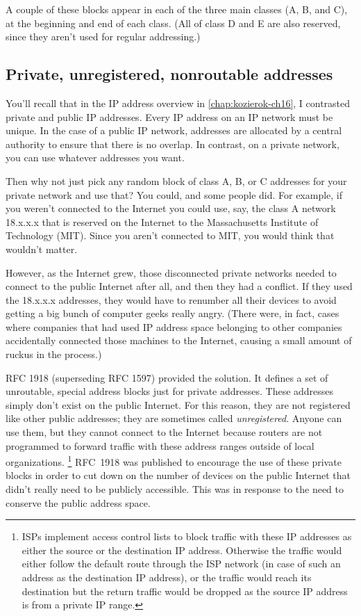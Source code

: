 A couple of these blocks appear in each of the three main classes (A, B, and C), at the beginning and end of each class.
(All of class D and E are also reserved, since they aren't used for regular addressing.)



\subsection{Private, unregistered, nonroutable addresses}

You'll recall that in the IP address overview in \vref{chap:kozierok-ch16}, I contrasted private and
public IP addresses. Every IP address on an IP network must be unique.
In the case of a public IP network, addresses are allocated by a central
authority to ensure that there is no overlap. In contrast, on a private
network, you can use whatever addresses you want.

Then why not just pick any random block of class A, B, or C addresses
for your private network and use that? You could, and some people did.
For example, if you weren't connected to the Internet you could use,
say, the class A network 18.x.x.x that is reserved on the Internet to the Massachusetts Institute of Technology (MIT).
Since you aren't connected to MIT, you would think that wouldn't matter.

However, as the Internet grew, those disconnected private networks
needed to connect to the public Internet after all, and then they had a
conflict. If they used the 18.x.x.x addresses, they would have to
renumber all their devices to avoid getting a big bunch of computer
geeks really angry. (There were, in fact, cases where companies that had
used IP address space belonging to other companies accidentally
connected those machines to the Internet, causing a small amount of ruckus in the process.)

RFC 1918 (superseding RFC 1597) provided the solution. It defines a set
of unroutable, special address blocks just for private addresses.
These addresses simply don't exist on the public Internet.
For this reason, they are not registered like other public addresses; they are sometimes called \emph{unregistered}.
Anyone can use them, but they cannot connect to the Internet because routers are not programmed to forward
traffic with these address ranges outside of local organizations.%
   \footnote{
      ISPs implement access control lists to block traffic with these IP addresses as either the source or the destination IP address.
      Otherwise the traffic would either follow the default route through the ISP network (in case of such an address as the destination IP address),
      or the traffic would reach its destination but the return traffic would be dropped as the source IP address is from a private IP range.
   }
RFC~1918 was published to encourage the use of these private blocks in order to cut down on the number of devices on the public Internet that didn't
really need to be publicly accessible.
This was in response to the need to conserve the public address space.

